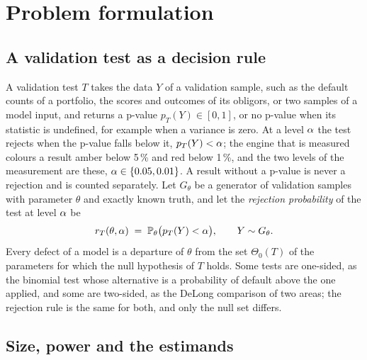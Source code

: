 \section{Problem formulation}
\label{sec:problem}

\subsection{A validation test as a decision rule}
\label{sec:pf-rule}

A validation test $T$ takes the data $Y$ of a validation sample, such as the default counts of a portfolio, the scores and outcomes of its obligors, or two samples of a model input, and returns a p-value $p_T(Y)\in[0,1]$, or no p-value when its statistic is undefined, for example when a variance is zero.
At a level $\alpha$ the test rejects when the p-value falls below it, $p_T(Y)<\alpha$; the engine that is measured colours a result amber below 5\,\% and red below 1\,\%, and the two levels of the measurement are these, $\alpha\in\{0.05,0.01\}$.
A result without a p-value is never a rejection and is counted separately.
Let $G_\theta$ be a generator of validation samples with parameter $\theta$ and exactly known truth, and let the \emph{rejection probability} of the test at level $\alpha$ be
\begin{equation}
r_T(\theta,\alpha)\;=\;\mathbb{P}_\theta\big(p_T(Y)<\alpha\big),\qquad Y\sim G_\theta .
\label{eq:rejection}
\end{equation}
Every defect of a model is a departure of $\theta$ from the set $\Theta_0(T)$ of the parameters for which the null hypothesis of $T$ holds. Some tests are one-sided, as the binomial test whose alternative is a probability of default above the one applied, and some are two-sided, as the DeLong comparison of two areas; the rejection rule is the same for both, and only the null set differs.

\subsection{Size, power and the estimands}
\label{sec:pf-estimands}

